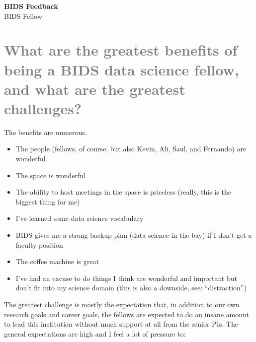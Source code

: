 \documentclass[a4paper, 10pt]{article}
\newcommand{\authorname}{BIDS Fellow}
\newcommand{\longauthorname}{BIDS Fellow}
\newcommand{\authorsite}{bids.berkeley.edu}
\begin{document}
\pagestyle{fancy}
\lhead{\textcolor{gray}{\it \authorname}}
\rhead{\textcolor{gray}{\thepage/\totalpages{}}}
\renewcommand{\headrulewidth}{0pt}
\renewcommand{\footrulewidth}{0pt}
\fancyfoot[C]{\footnotesize \textcolor{gray}{\authorsite}}

\begin{center}
{\LARGE \bf BIDS Feedback}\\
\vspace*{0.1cm}
{\normalsize \longauthorname}
\end{center}



\section{\textcolor{gray}{What are the greatest benefits of being a BIDS data science fellow, and what are the greatest challenges?}}

The benefits are numerous.
\begin{itemize}
\item The people (fellows, of course, but also Kevin, Ali, Saul, and Fernando) are wonderful
\item The space is wonderful
\item The ability to host meetings in the space is priceless (really, this is the biggest thing for me)
\item I’ve learned some data science vocabulary
\item BIDS gives me a strong backup plan (data science in the bay) if I don't get a faculty position
\item The coffee machine is great
\item I’ve had an excuse to do things I think are wonderful and important but don't fit into my science domain (this is also a downside, see: “distraction”)
\end{itemize}

The greatest challenge is mostly the expectation that, in addition to our own
research goals and career goals, the fellows are expected to do an insane
amount to lead this institution without much support at all from the senior
PIs. The general expectations are high and I feel a lot of pressure to:
\end{document}
